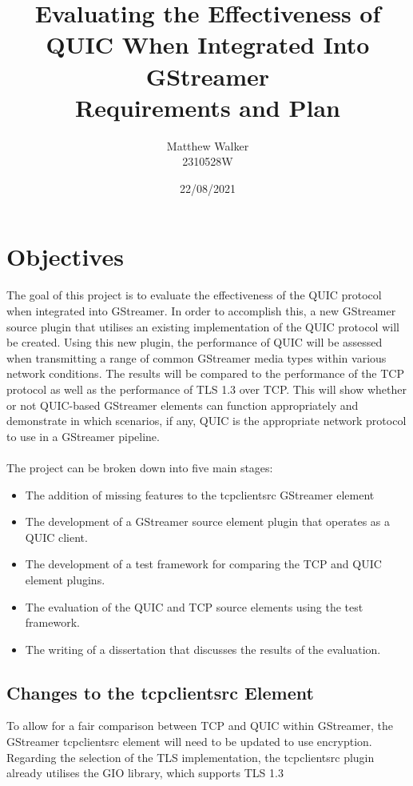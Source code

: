 \documentclass[11pt]{article}
\title{
    Evaluating the Effectiveness of QUIC When Integrated Into GStreamer \\
  Requirements and Plan}
\author{Matthew Walker \\ 2310528W}
\date{22/08/2021}
\begin{document}
\maketitle

\section{Objectives} 

The goal of this project is to evaluate the effectiveness of the QUIC protocol when integrated into GStreamer. In order to accomplish this, a new GStreamer source plugin that utilises an existing implementation of the QUIC protocol will be created. Using this new plugin, the performance of QUIC will be assessed when transmitting a range of common GStreamer media types within various network conditions. The results will be compared to the performance of the TCP protocol as well as the performance of TLS 1.3 over TCP. This will show whether or not QUIC-based GStreamer elements can function appropriately and demonstrate in which scenarios, if any, QUIC is the appropriate network protocol to use in a GStreamer pipeline.
\\\\
The project can be broken down into five main stages:

\begin{itemize}
    \item The addition of missing features to the tcpclientsrc GStreamer element
    \item The development of a GStreamer source element plugin that operates as a QUIC client.
    \item The development of a test framework for comparing the TCP and QUIC element plugins.
    \item The evaluation of the QUIC and TCP source elements using the test framework.
    \item The writing of a dissertation that discusses the results of the evaluation.
\end{itemize}

\subsection{Changes to the tcpclientsrc Element}

To allow for a fair comparison between TCP and QUIC within GStreamer, the GStreamer tcpclientsrc element will need to be updated to use encryption. Regarding the selection of the TLS implementation, the tcpclientsrc plugin already utilises the GIO library, which supports TLS 1.3
\end{document}
